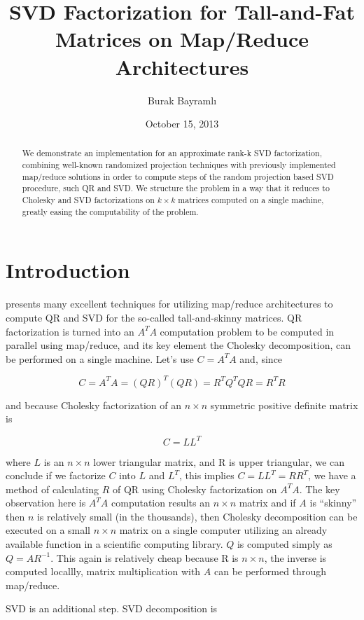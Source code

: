 \documentclass[11pt]{article}
\begin{document}
\title{SVD Factorization for Tall-and-Fat Matrices on Map/Reduce Architectures} 

\author{Burak Bayramlı} \date{October 15, 2013}

\begin{abstract}
  We demonstrate an implementation for an approximate rank-k SVD
  factorization, combining well-known randomized projection techniques with
  previously implemented map/reduce solutions in order to compute steps of
  the random projection based SVD procedure, such QR and SVD. We structure
  the problem in a way that it reduces to Cholesky and SVD factorizations
  on $k \times k$ matrices computed on a single machine, greatly easing the
  computability of the problem.
\end{abstract}

\section{Introduction} \label{intro}

\cite{gleich} presents many excellent techniques for utilizing map/reduce
architectures to compute QR and SVD for the so-called tall-and-skinny
matrices. QR factorization is turned into an $A^TA$ computation problem to
be computed in parallel using map/reduce, and its key element the Cholesky
decomposition, can be performed on a single machine. Let's use $C = A^TA$
and, since

$$ C = A^TA = (QR)^T(QR) = R^TQ^TQR = R^TR $$

and because Cholesky factorization of an $n \times n$ symmetric positive
definite matrix is

$$ C = LL^T $$

where $L$ is an $n \times n$ lower triangular matrix, and R is upper
triangular, we can conclude if we factorize $C$ into $L$ and $L^T$, this
implies $C = LL^T = RR^T$, we have a method of calculating $R$ of QR using
Cholesky factorization on $A^TA$. The key observation here is $A^TA$
computation results an $n \times n$ matrix and if $A$ is ``skinny'' then
$n$ is relatively small (in the thousands), then Cholesky decomposition can
be executed on a small $n \times n$ matrix on a single computer utilizing
an already available function in a scientific computing library. $Q$ is
computed simply as $Q = AR^{-1}$. This again is relatively cheap because R
is $n \times n$, the inverse is computed locallly, matrix multiplication
with $A$ can be performed through map/reduce.

SVD is an additional step. SVD decomposition is 
\end{document}
